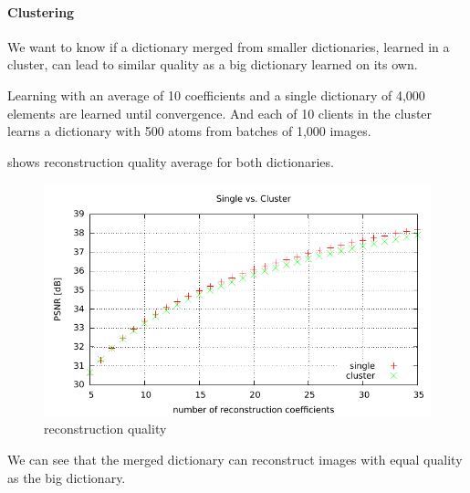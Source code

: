 \paragraph{Clustering}
We want to know if a dictionary merged from smaller dictionaries, learned in a
cluster, can lead to similar quality as a big dictionary learned on its own.

Learning with an average of 10 coefficients and a single dictionary of 4,000
elements are learned until convergence. And each of 10 clients in the cluster
learns a dictionary with 500 atoms from batches of 1,000 images. 

 shows reconstruction quality average for both
dictionaries.


\begin{figure}[H]
\centering
\includegraphics[width = 1.0\textwidth]{../tests/results/coeffsConvergInc.pdf}
\caption{reconstruction quality}
\label{fig:coeffsConvergInc}
\end{figure}

We can see that the merged dictionary can reconstruct images with equal quality
as the big dictionary. 


